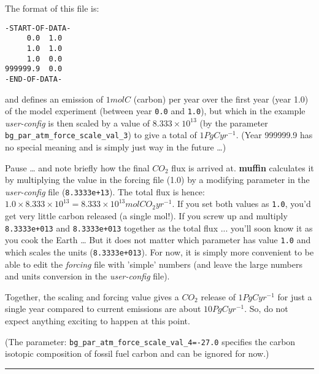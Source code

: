 \documentclass[11pt,fleqn]{book} %
\begin{document}
\noindent The format of this file is:
\vspace{-2pt}\begin{verbatim}
-START-OF-DATA-
     0.0  1.0 
     1.0  1.0
     1.0  0.0
999999.9  0.0
-END-OF-DATA-
\end{verbatim}\vspace{-2pt}

\noindent and defines an emission of \(1 mol C\) (carbon) per year over the first year (year 1.0) of the model experiment (between year \texttt{0.0} and \texttt{1.0}), but which in the example \textit{user-config} is then scaled by a value of \(8.333\times10^{13}\) (by the parameter \texttt{bg\_par\_atm\_force\_scale\_val\_3}) to give a total of \(1 PgC yr^{-1}\). (Year 999999.9 has no special meaning and is simply just way in the future …)

Pause … and note briefly how the final \(CO_{2}\) flux is arrived at. \textbf{muffin} calculates it by multiplying the value in the forcing file (1.0) by a modifying parameter in the \textit{user-config} file (\texttt{8.3333e+13}). The total flux is hence: \(1.0 \times 8.333\times10^{13} = 8.333\times10^{13} mol CO_{2} yr^{-1}\). If you set both values as \texttt{1.0}, you’d get very little carbon released (a single mol!). If you screw up and multiply \texttt{8.3333e+013} and \texttt{8.3333e+013} together as the total flux ... you’ll soon know it as you cook the Earth … But it does not matter which parameter has value \texttt{1.0} and which scales the units (\texttt{8.3333e+013}). For now, it is simply more convenient to be able to edit the \textit{forcing} file with 'simple' numbers (and leave the large numbers and units conversion in the \textit{user-config} file).

Together, the scaling and forcing value gives a \(CO_{2}\) release of \(1 PgC yr^{-1}\) for just a single year compared to current emissions are about \(10 PgC yr^{-1}\). So, do not expect anything exciting to happen at this point.

(The parameter: \texttt{bg\_par\_atm\_force\_scale\_val\_4=-27.0} specifies the carbon isotopic composition of fossil fuel carbon and can be ignored for now.)

\vspace{1mm}
\noindent\rule{4cm}{0.1mm}
\vspace{2mm}
\end{document}
